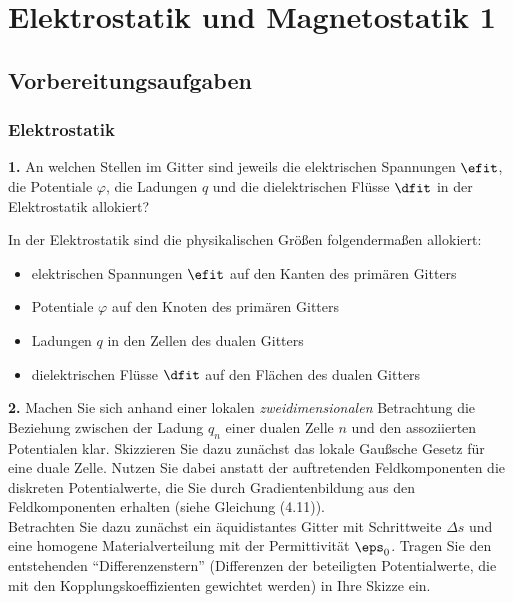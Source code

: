 \documentclass[./Protokollheft.tex]{subfiles}
\begin{document}
\chapter{Elektrostatik und Magnetostatik 1}
\section{Vorbereitungsaufgaben}

{\subsection{Elektrostatik}}

\begin{framed}
	\noindent \textbf{1.} An welchen Stellen im Gitter sind jeweils die elektrischen
Spannungen $\efit$, die Potentiale $\varphi$, die Ladungen $q$ und die
dielektrischen Flüsse $\dfit$ in der Elektrostatik allokiert?\label{exer:allocateElectrical}
\end{framed}


In der Elektrostatik sind die physikalischen Größen folgendermaßen allokiert:
\begin{itemize} 
\item elektrischen Spannungen $\efit$ auf den Kanten des primären Gitters
\item Potentiale $\varphi$ auf den Knoten des primären Gitters
\item Ladungen $q$ in den Zellen des dualen Gitters
\item dielektrischen Flüsse $\dfit$ auf den Flächen des dualen Gitters
\end{itemize}

\begin{framed}
	\noindent \textbf{2.} Machen Sie sich anhand einer lokalen \emph{zweidimensionalen}
Betrachtung die Beziehung zwischen der Ladung $q_n$ einer dualen Zelle $n$ und
den assoziierten Potentialen klar. Skizzieren
Sie dazu zunächst das lokale Gaußsche Gesetz für eine duale
Zelle. Nutzen Sie dabei anstatt der auftretenden Feldkomponenten 
die diskreten Potentialwerte, die Sie durch Gradientenbildung aus den 
Feldkomponenten erhalten (siehe Gleichung (4.11)).\\
Betrachten Sie dazu zunächst ein äquidistantes Gitter mit
Schrittweite $\Delta s$ und eine homogene Materialverteilung mit der
Permittivität $\eps_0$. Tragen Sie den entstehenden
"`Differenzenstern"' (Differenzen der beteiligten Potentialwerte,
die mit den Kopplungskoeffizienten gewichtet werden) in Ihre
Skizze ein.\label{exer:diffStar}
\end{framed}
\end{document}
